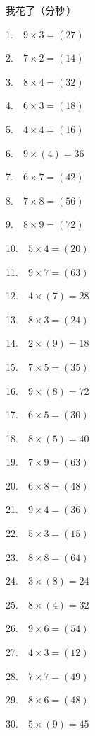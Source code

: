 \documentclass[a4paper]{extarticle}
\begin{document}
\noindent 我花了（\hspace{1cm}分\hspace{1cm}秒\,）

\vspace{0.6cm}

\begin{multicols}{3}
\raggedcolumns
\columnsep=1.5cm
\setlength{\baselineskip}{2.8\baselineskip}

1. \,\, $9 \times 3 = (27)$

2. \,\, $7 \times 2 = (14)$

3. \,\, $8 \times 4 = (32)$

4. \,\, $6 \times 3 = (18)$

5. \,\, $4 \times 4 = (16)$

6. \,\, $9 \times (4) = 36$

7. \,\, $6 \times 7 = (42)$

8. \,\, $7 \times 8 = (56)$

9. \,\, $8 \times 9 = (72)$

10. \,\, $5 \times 4 = (20)$

11. \,\, $9 \times 7 = (63)$

12. \,\, $4 \times (7) = 28$

13. \,\, $8 \times 3 = (24)$

14. \,\, $2 \times (9) = 18$

15. \,\, $7 \times 5 = (35)$

16. \,\, $9 \times (8) = 72$

\columnbreak

17. \,\, $6 \times 5 = (30)$

18. \,\, $8 \times (5) = 40$

19. \,\, $7 \times 9 = (63)$

20. \,\, $6 \times 8 = (48)$

21. \,\, $9 \times 4 = (36)$

22. \,\, $5 \times 3 = (15)$

23. \,\, $8 \times 8 = (64)$

24. \,\, $3 \times (8) = 24$

25. \,\, $8 \times (4) = 32$

26. \,\, $9 \times 6 = (54)$

27. \,\, $4 \times 3 = (12)$

28. \,\, $7 \times 7 = (49)$

29. \,\, $8 \times 6 = (48)$

30. \,\, $5 \times (9) = 45$


\end{multicols}
\end{document}
